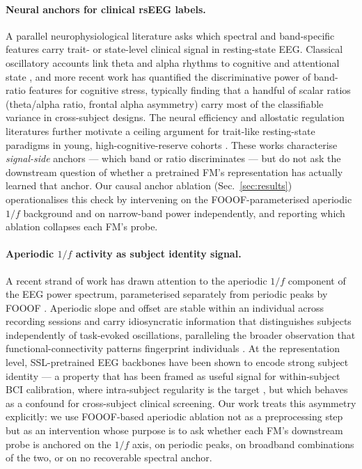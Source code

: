 \paragraph{Neural anchors for clinical rsEEG labels.}
A parallel neurophysiological literature asks which spectral and
band-specific features carry trait- or state-level clinical signal
in resting-state EEG. Classical oscillatory accounts link theta and
alpha rhythms to cognitive and attentional state
\citep{klimesch1999,klimesch2012update,pfurtscheller1979}, and more
recent work has quantified the discriminative power of band-ratio
features for cognitive stress, typically finding that a handful of
scalar ratios (theta/alpha ratio, frontal alpha asymmetry) carry most
of the classifiable variance in cross-subject designs. The neural
efficiency and allostatic regulation literatures further motivate a
ceiling argument for trait-like resting-state paradigms in young,
high-cognitive-reserve cohorts \citep{lovibond1995}. These works
characterise \emph{signal-side} anchors --- which band or ratio
discriminates --- but do not ask the downstream question of whether
a pretrained FM's representation has actually learned that anchor.
Our causal anchor ablation (Sec.~\ref{sec:results}) operationalises
this check by intervening on the FOOOF-parameterised aperiodic
$1/f$ background \citep{donoghue2020fooof} and on narrow-band
power independently, and reporting which ablation collapses each
FM's probe.

\paragraph{Aperiodic $1/f$ activity as subject identity signal.}
A recent strand of work has drawn attention to the aperiodic $1/f$
component of the EEG power spectrum, parameterised separately from
periodic peaks by FOOOF \citep{donoghue2020fooof}. Aperiodic slope
and offset are stable within an individual across recording sessions
and carry idiosyncratic information that distinguishes subjects
independently of task-evoked oscillations, paralleling the broader
observation that functional-connectivity patterns fingerprint
individuals \citep{finn2015,campisi2014,marcel2007}. At the
representation level, SSL-pretrained EEG backbones have been shown to
encode strong subject identity --- a property that has been framed as
useful signal for within-subject BCI calibration, where
intra-subject regularity is the target \citep{multidataset2025},
but which behaves as a confound for cross-subject clinical
screening. Our work treats this asymmetry explicitly: we use
FOOOF-based aperiodic ablation not as a preprocessing step but as an
intervention whose purpose is to ask whether each FM's downstream
probe is anchored on the $1/f$ axis, on periodic peaks, on broadband
combinations of the two, or on no recoverable spectral anchor.

